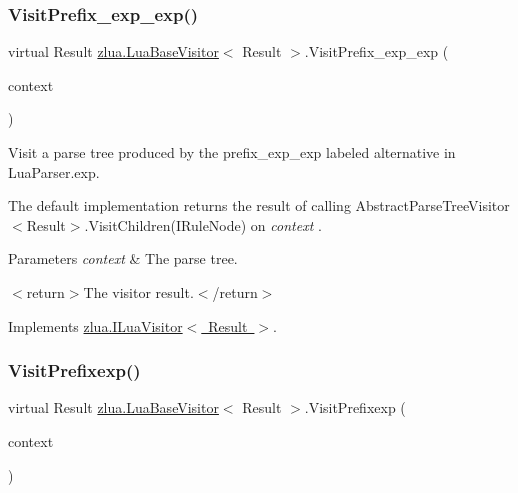 \subsubsection{\texorpdfstring{Visit\+Prefix\+\_\+exp\+\_\+exp()}{VisitPrefix\_exp\_exp()}}
{\footnotesize\ttfamily virtual Result \mbox{\hyperlink{classzlua_1_1_lua_base_visitor}{zlua.\+Lua\+Base\+Visitor}}$<$ Result $>$.Visit\+Prefix\+\_\+exp\+\_\+exp (\begin{DoxyParamCaption}\item[{\mbox{[}\+Not\+Null\mbox{]} \mbox{\hyperlink{classzlua_1_1_lua_parser_1_1_prefix__exp__exp_context}{Lua\+Parser.\+Prefix\+\_\+exp\+\_\+exp\+Context}}}]{context }\end{DoxyParamCaption})\hspace{0.3cm}{\ttfamily [virtual]}}



Visit a parse tree produced by the {\ttfamily prefix\+\_\+exp\+\_\+exp} labeled alternative in Lua\+Parser.\+exp. 

The default implementation returns the result of calling Abstract\+Parse\+Tree\+Visitor$<$\+Result$>$.\+Visit\+Children(\+I\+Rule\+Node) on {\itshape context} . 


\begin{DoxyParams}{Parameters}
{\em context} & The parse tree.\\
\hline
\end{DoxyParams}
$<$return$>$The visitor result.$<$/return$>$ 

Implements \mbox{\hyperlink{interfacezlua_1_1_i_lua_visitor_a8183a0ec15a6a77848310e5ea034e45d}{zlua.\+I\+Lua\+Visitor$<$ Result $>$}}.

\mbox{\label{classzlua_1_1_lua_base_visitor_acad38edf087a3f799cf610a005c16715}} 
\subsubsection{\texorpdfstring{Visit\+Prefixexp()}{VisitPrefixexp()}}
{\footnotesize\ttfamily virtual Result \mbox{\hyperlink{classzlua_1_1_lua_base_visitor}{zlua.\+Lua\+Base\+Visitor}}$<$ Result $>$.Visit\+Prefixexp (\begin{DoxyParamCaption}\item[{\mbox{[}\+Not\+Null\mbox{]} \mbox{\hyperlink{classzlua_1_1_lua_parser_1_1_prefixexp_context}{Lua\+Parser.\+Prefixexp\+Context}}}]{context }\end{DoxyParamCaption})\hspace{0.3cm}{\ttfamily [virtual]}}



